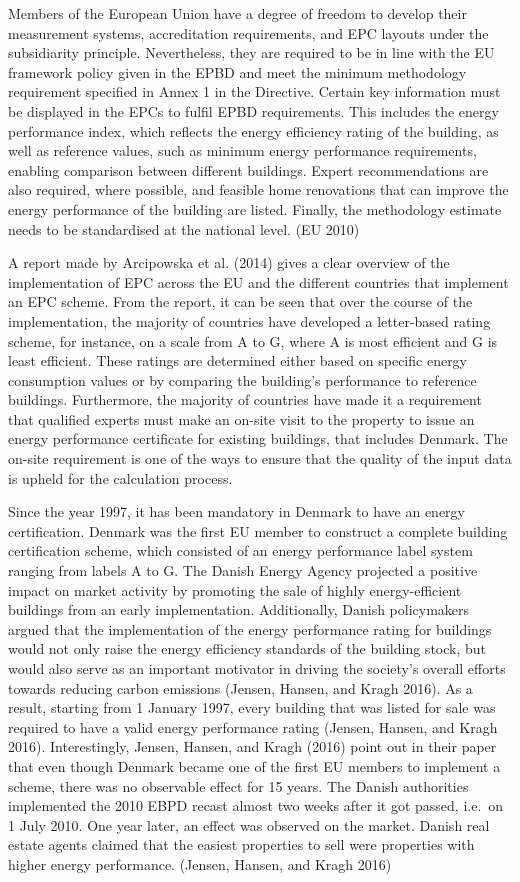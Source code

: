 \documentclass[
  letterpaper,
  DIV=11,
  numbers=noendperiod]{scrreprt}
\begin{document}
Members of the European Union have a degree of freedom to develop their
measurement systems, accreditation requirements, and EPC layouts under
the subsidiarity principle. Nevertheless, they are required to be in
line with the EU framework policy given in the EPBD and meet the minimum
methodology requirement specified in Annex 1 in the Directive. Certain
key information must be displayed in the EPCs to fulfil EPBD
requirements. This includes the energy performance index, which reflects
the energy efficiency rating of the building, as well as reference
values, such as minimum energy performance requirements, enabling
comparison between different buildings. Expert recommendations are also
required, where possible, and feasible home renovations that can improve
the energy performance of the building are listed. Finally, the
methodology estimate needs to be standardised at the national level. (EU
2010)

A report made by Arcipowska et al. (2014) gives a clear overview of the
implementation of EPC across the EU and the different countries that
implement an EPC scheme. From the report, it can be seen that over the
course of the implementation, the majority of countries have developed a
letter-based rating scheme, for instance, on a scale from A to G, where
A is most efficient and G is least efficient. These ratings are
determined either based on specific energy consumption values or by
comparing the building's performance to reference buildings.
Furthermore, the majority of countries have made it a requirement that
qualified experts must make an on-site visit to the property to issue an
energy performance certificate for existing buildings, that includes
Denmark. The on-site requirement is one of the ways to ensure that the
quality of the input data is upheld for the calculation process.

Since the year 1997, it has been mandatory in Denmark to have an energy
certification. Denmark was the first EU member to construct a complete
building certification scheme, which consisted of an energy performance
label system ranging from labels A to G. The Danish Energy Agency
projected a positive impact on market activity by promoting the sale of
highly energy-efficient buildings from an early implementation.
Additionally, Danish policymakers argued that the implementation of the
energy performance rating for buildings would not only raise the energy
efficiency standards of the building stock, but would also serve as an
important motivator in driving the society's overall efforts towards
reducing carbon emissions (Jensen, Hansen, and Kragh 2016). As a result,
starting from 1 January 1997, every building that was listed for sale
was required to have a valid energy performance rating (Jensen, Hansen,
and Kragh 2016). Interestingly, Jensen, Hansen, and Kragh (2016) point
out in their paper that even though Denmark became one of the first EU
members to implement a scheme, there was no observable effect for 15
years. The Danish authorities implemented the 2010 EBPD recast almost
two weeks after it got passed, i.e.~on 1 July 2010. One year later, an
effect was observed on the market. Danish real estate agents claimed
that the easiest properties to sell were properties with higher energy
performance. (Jensen, Hansen, and Kragh 2016)
\end{document}
